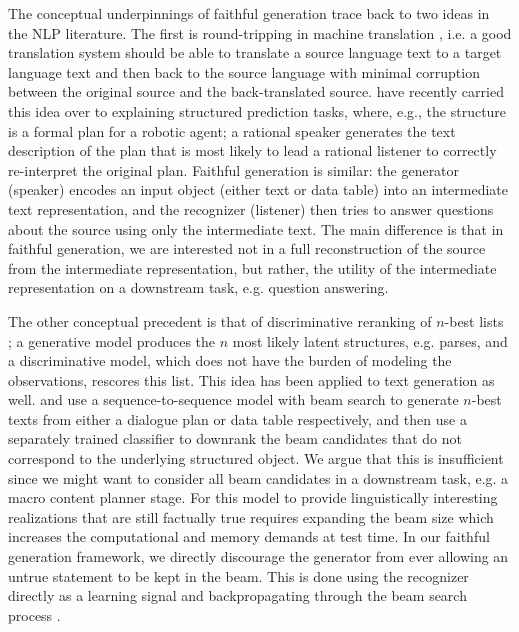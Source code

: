 The conceptual underpinnings of faithful generation trace back to two
ideas in the NLP literature. The first is round-tripping in machine translation
\citep{somers2005round,rapp2009back}, i.e. a good translation system should be able to translate
a source language text to a target language text and then back to the source
language with minimal corruption between the original source and the 
back-translated source. \cite{andreas2016reasoning} have recently carried 
this idea 
over to explaining structured prediction tasks, where, e.g., 
the structure is a 
formal plan for a robotic agent; a rational speaker  generates the text
description of the plan that is most likely to lead a rational listener 
to correctly re-interpret the original plan. Faithful generation is similar:
the generator (speaker) 
 encodes an 
input object
(either text or data table) into 
an intermediate text representation, and the recognizer (listener) then tries to 
answer questions about the source using only the intermediate text.
The main difference is that in faithful generation, we are interested not in
a full reconstruction of the source from the intermediate representation, but
rather, the utility of the intermediate representation on a downstream task, 
e.g. question answering.


The other conceptual precedent is that of discriminative reranking 
of $n$-best lists \citep{collins2005discriminative,charniak2005coarse};
a generative model produces the $n$ most likely latent structures, e.g. parses,
and a discriminative model, which does not have the burden of modeling
the observations, rescores this list.  This idea has been applied 
to text generation as well. \cite{wen2015stochastic} and 
\cite{novikova2017e2e} use a 
sequence-to-sequence
model with beam search to generate $n$-best texts from either a 
dialogue plan or data table respectively,
 and then use a separately trained
classifier to downrank the beam candidates that do not correspond to the 
underlying
structured object.
We argue that this is insufficient since we might want to consider 
all beam candidates in a downstream task, e.g. a macro content planner stage.
For this model to provide linguistically interesting realizations that are 
still
factually true requires expanding the beam size 
which increases the computational and memory demands at test time. 
In our faithful generation framework, we directly discourage the generator from
ever allowing an untrue statement to be kept in the beam. This is done
using the recognizer directly as a learning signal and backpropagating
through the beam search process \citep{wiseman2016sequence}.

